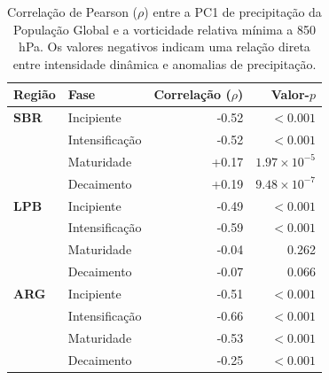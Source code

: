 \begin{table}[htbp]
\centering
\caption[Correlação de Pearson entre PC1 e vorticidade --- População Global]{Correlação de Pearson ($\rho$) entre a PC1 de precipitação da População Global e a vorticidade relativa mínima a 850 hPa. Os valores negativos indicam uma relação direta entre intensidade dinâmica e anomalias de precipitação.}
\label{tab:corr_global_tp}
\begin{tabular*}{\textwidth}{@{\extracolsep{\fill}}llrr}
\hline
\textbf{Região} & \textbf{Fase} & \textbf{Correlação ($\rho$)} & \textbf{Valor-$p$} \\
\hline
\textbf{SBR} & Incipiente & -0.52 & $<0.001$ \\
 & Intensificação & -0.52 & $<0.001$ \\
 & Maturidade & +0.17 & $1.97\times10^{-5}$ \\
 & Decaimento & +0.19 & $9.48\times10^{-7}$ \\
\hline
\textbf{LPB} & Incipiente & -0.49 & $<0.001$ \\
 & Intensificação & -0.59 & $<0.001$ \\
 & Maturidade & -0.04 & 0.262 \\
 & Decaimento & -0.07 & 0.066 \\
\hline
\textbf{ARG} & Incipiente & -0.51 & $<0.001$ \\
 & Intensificação & -0.66 & $<0.001$ \\
 & Maturidade & -0.53 & $<0.001$ \\
 & Decaimento & -0.25 & $<0.001$ \\
\hline
\end{tabular*}
\end{table}